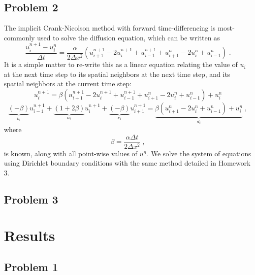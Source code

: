 \documentclass[11pt]{article}
\begin{document}
\subsection{Problem 2}

The implicit Crank-Nicolson method with forward time-differencing is most-commonly used to solve the diffusion equation, which can be written as
\begin{equation}
\frac{u_i^{n+1} - u_i^n}{\Delta t}
=
\frac{\alpha}{2 \Delta x^2}
\left(
u_{i+1}^{n+1} - 2 u_i^{n+1} + u_{i-1}^{n+1} + u_{i+1}^n - 2 u_i^n + u_{i-1}^n
\right)
\;.
\end{equation}
It is a simple matter to re-write this as a linear equation relating the value of $u_i$ at the next time step to its spatial neighbors at the next time step, and its spatial neighbors at the current time step:
\begin{equation}
u_i^{n+1}
=
\beta
\left(
u_{i+1}^{n+1} - 2 u_i^{n+1} + u_{i-1}^{n+1} + u_{i+1}^n - 2 u_i^n + u_{i-1}^n
\right)
+ u_i^n
\end{equation}
\begin{equation}
  \underbrace{\left(      -\beta \right)}_{b_i} u_{i-1}^{n+1}
+ \underbrace{\left( 1 + 2 \beta \right)}_{a_i} u_i^{n+1}
+ \underbrace{\left(      -\beta \right)}_{c_i} u_{i+1}^{n+1}
=
\underbrace{\beta \left( u_{i+1}^n - 2 u_i^n + u_{i-1}^n \right) + u_i^n}_{d_i}
\;,
\end{equation}
where
\begin{equation}
\beta = \frac{\alpha \Delta t}{2 \Delta x^2}
\;,
\end{equation}
is known, along with all point-wise values of $u^n$. We solve the system of equations using Dirichlet boundary conditions with the same method detailed in Homework 3.

\subsection{Problem 3}

\section{Results} %

\subsection{Problem 1}
\end{document}
